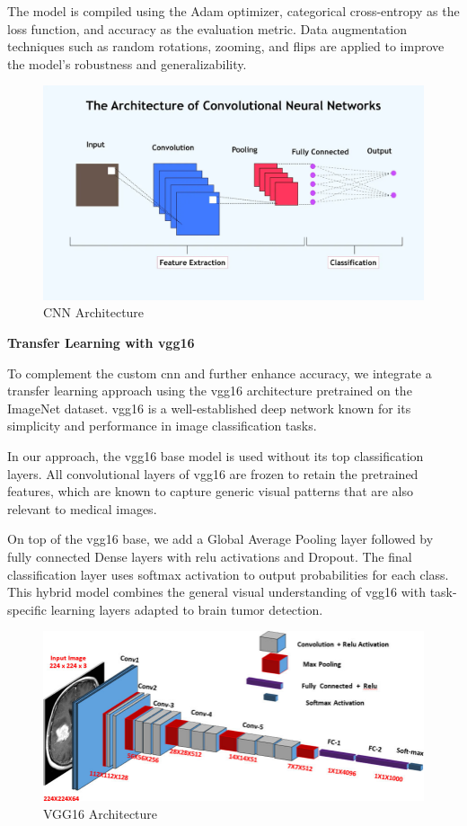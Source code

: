 The model is compiled using the Adam optimizer, categorical cross-entropy as the loss function, and accuracy as the evaluation metric. Data augmentation techniques such as random rotations, zooming, and flips are applied to improve the model's robustness and generalizability.

\begin{figure}[H]
    \centering
    \includegraphics[width=0.85\linewidth]{Images/cnn.png}
    \caption{CNN Architecture}
    \label{fig:CNN Architecture}
\end{figure}

\textbf{Transfer Learning with \gls{vgg16}}

To complement the custom \gls{cnn} and further enhance accuracy, we integrate a transfer learning approach using the \gls{vgg16} architecture pretrained on the ImageNet dataset. \gls{vgg16} is a well-established deep network known for its simplicity and performance in image classification tasks.

In our approach, the \gls{vgg16} base model is used without its top classification layers. All convolutional layers of \gls{vgg16} are frozen to retain the pretrained features, which are known to capture generic visual patterns that are also relevant to medical images.

On top of the \gls{vgg16} base, we add a Global Average Pooling layer followed by fully connected Dense layers with \gls{relu} activations and Dropout. The final classification layer uses softmax activation to output probabilities for each class. This hybrid model combines the general visual understanding of \gls{vgg16} with task-specific learning layers adapted to brain tumor detection.

\begin{figure}[H]
    \centering
    \includegraphics[width=0.85\linewidth]{Images/vgg16.jpg}
    \caption{VGG16 Architecture}
    \label{fig:VGG16 Architecture}
\end{figure}



